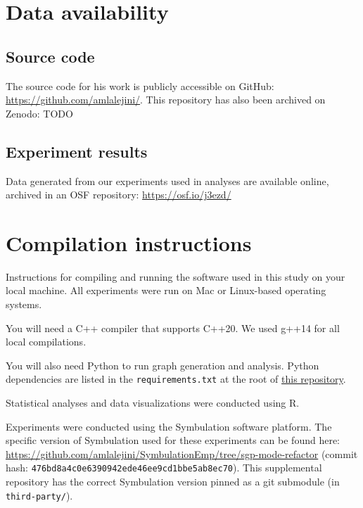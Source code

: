 \documentclass[
]{book}
\begin{document}
\hypertarget{data-availability}{%
\chapter{Data availability}\label{data-availability}}

\hypertarget{source-code}{%
\section{Source code}\label{source-code}}

The source code for his work is publicly accessible on GitHub: \url{https://github.com/amlalejini/}.
This repository has also been archived on Zenodo: TODO

\hypertarget{experiment-results}{%
\section{Experiment results}\label{experiment-results}}

Data generated from our experiments used in analyses are available online, archived in an OSF repository: \url{https://osf.io/j3ezd/}

\hypertarget{compilation-instructions}{%
\chapter{Compilation instructions}\label{compilation-instructions}}

Instructions for compiling and running the software used in this study on your local machine.
All experiments were run on Mac or Linux-based operating systems.

You will need a C++ compiler that supports C++20.
We used g++14 for all local compilations.

You will also need Python to run graph generation and analysis.
Python dependencies are listed in the \texttt{requirements.txt} at the root of \href{https://github.com/amlalejini/2026-alife-mutualism-constrains-evolution}{this repository}.

Statistical analyses and data visualizations were conducted using R.

Experiments were conducted using the Symbulation software platform.
The specific version of Symbulation used for these experiments can be found here: \url{https://github.com/amlalejini/SymbulationEmp/tree/sgp-mode-refactor} (commit hash: \texttt{476bd8a4c0e6390942ede46ee9cd1bbe5ab8ec70}).
This supplemental repository has the correct Symbulation version pinned as a git submodule (in \texttt{third-party/}).
\end{document}
